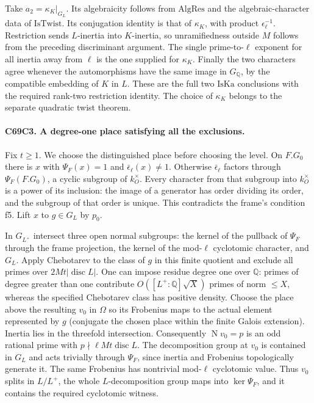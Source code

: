 Take $a_2=\kappa_K|_{G_L}$. Its algebraicity follows from
$\mathrm{AlgRes}$ and the algebraic-character data of $\mathrm{IsTwist}$.
Its conjugation identity is that of $\kappa_K$, with product
$\epsilon_\ell^{-1}$. Restriction sends $L$-inertia into $K$-inertia,
so unramifiedness outside $M$ follows from the preceding discriminant
argument. The single prime-to-$\ell$ exponent for all inertia away
from $\ell$ is the one supplied for $\kappa_K$. Finally the two
characters agree whenever the automorphisms have the same image in
$G_{\mathbb Q}$, by the compatible embedding of $K$ in $L$. These
are the full two $\mathrm{IsKa}$ conclusions with the required
rank-two restriction identity. The choice of $\kappa_K$ belongs to
the separate quadratic twist theorem.

\paragraph{C69C3. A degree-one place satisfying all the exclusions.}
Fix $t\ge1$. We choose the distinguished place before choosing the
level. On $F.G_0$ there is $x$ with $\Psi_F(x)=1$ and
$\bar\epsilon_\ell(x)\ne1$. Otherwise $\bar\epsilon_\ell$ factors
through $\Psi_F(F.G_0)$, a cyclic subgroup of $k_O^\times$. Every
character from that subgroup into $k_O^\times$ is a power of its
inclusion: the image of a generator has order dividing its order,
and the subgroup of that order is unique. This contradicts the
frame's condition f5. Lift $x$ to $g\in G_L$ by $p_0$.

In $G_{L^+}$ intersect three open normal subgroups: the kernel of
the pullback of $\Psi_F$ through the frame projection, the kernel
of the mod-$\ell$ cyclotomic character, and $G_L$. Apply Chebotarev
to the class of $g$ in this finite quotient and exclude all primes
over $2Mt|\operatorname{disc}L|$. One can impose residue degree one
over $\mathbb Q$: primes of degree greater than one contribute
$O([L^+:\mathbb Q]\sqrt X)$ primes of norm $\le X$, whereas the
specified Chebotarev class has positive density. Choose the place
above the resulting $v_0$ in $\Omega$ so its Frobenius maps to the
actual element represented by $g$ (conjugate the chosen place
within the finite Galois extension). Inertia lies in the threefold
intersection. Consequently $\operatorname{N}v_0=p$ is an odd rational
prime with $p\nmid\ell Mt\operatorname{disc}L$. The decomposition
group at $v_0$ is contained in $G_L$ and acts trivially through
$\Psi_F$, since inertia and Frobenius topologically generate it.
The same Frobenius has nontrivial mod-$\ell$ cyclotomic value. Thus
$v_0$ splits in $L/L^+$, the whole $L$-decomposition group maps
into $\ker\Psi_F$, and it contains the required cyclotomic witness.

